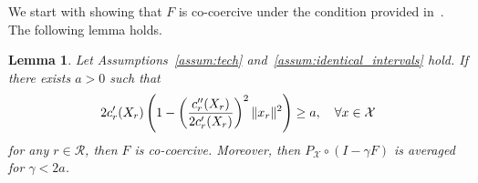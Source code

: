\documentclass[letterpaper, 10 pt, conference]{ieeeconf}  %
\newcommand{\mc}[1]{\mathcal{#1}}
\newtheorem{lem}{Lemma}
\begin{document}
We start with showing that $F$ is co-coercive under the condition provided in~\cite{Jacquot2018Analysis}.
The following lemma holds.
\begin{lem}\label{lem:cocoercive}
Let Assumptions~\ref{assum:tech} and~\ref{assum:identical_intervals} hold.
If there exists $a>0$ such that
\begin{equation}\label{eq:cond_conv}
 2c'_r(X_r)\left(
 1-
 \left(
 \dfrac{c''_r(X_r)}{2c'_r(X_r)}
 \right)^2
 \|x_r\|^2
 \right)\geq a,\quad \forall x\in\mc{X}
\if0
 2c^{i \prime}_r(X_r)\left(
 1-
 \left(
 \dfrac{c^{i \prime \prime}_r(X_r)}{2c^{i \prime}_r(X_r)}
 \right)^2
 \|x_r\|^2
 \right)\geq a,\quad \forall x\in\mc{X}
\fi
\end{equation}
for any $r\in\mc{R}$, then $F$ is co-coercive.
Moreover, then $P_{\mc{X}} \circ (I-\gamma F)$ is averaged for $\gamma<2a$.
\end{lem}
\end{document}
